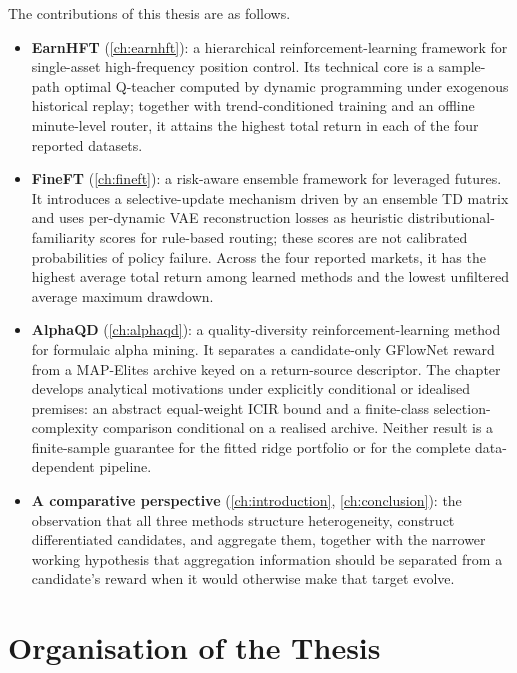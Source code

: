 The contributions of this thesis are as follows.

\begin{itemize}
\item \textbf{EarnHFT} (\cref{ch:earnhft}): a hierarchical reinforcement-learning framework for single-asset high-frequency position control. Its technical core is a sample-path optimal Q-teacher computed by dynamic programming under exogenous historical replay; together with trend-conditioned training and an offline minute-level router, it attains the highest total return in each of the four reported datasets.

\item \textbf{FineFT} (\cref{ch:fineft}): a risk-aware ensemble framework for leveraged futures. It introduces a selective-update mechanism driven by an ensemble TD matrix and uses per-dynamic VAE reconstruction losses as heuristic distributional-familiarity scores for rule-based routing; these scores are not calibrated probabilities of policy failure. Across the four reported markets, it has the highest average total return among learned methods and the lowest unfiltered average maximum drawdown.

\item \textbf{AlphaQD} (\cref{ch:alphaqd}): a quality-diversity reinforcement-learning method for formulaic alpha mining. It separates a candidate-only GFlowNet reward from a MAP-Elites archive keyed on a return-source descriptor. The chapter develops analytical motivations under explicitly conditional or idealised premises: an abstract equal-weight ICIR bound and a finite-class selection-complexity comparison conditional on a realised archive. Neither result is a finite-sample guarantee for the fitted ridge portfolio or for the complete data-dependent pipeline.

\item \textbf{A comparative perspective} (\cref{ch:introduction}, \cref{ch:conclusion}): the observation that all three methods structure heterogeneity, construct differentiated candidates, and aggregate them, together with the narrower working hypothesis that aggregation information should be separated from a candidate's reward when it would otherwise make that target evolve.
\end{itemize}

\section{Organisation of the Thesis}
\label{sec:intro_outline}

